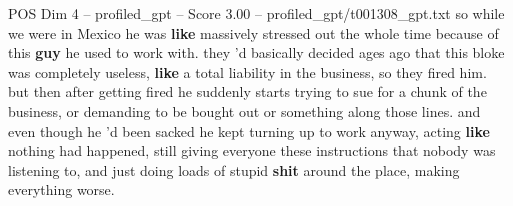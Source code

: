 \begin{textsample}{POS Dim 4 – profiled\_gpt – Score 3.00 – profiled\_gpt/t001308\_gpt.txt}  \label{ex:f4_pos_031}
so while we were in Mexico he was \textbf{like} massively stressed out the whole time because of this \textbf{guy} he used to work with. they ’d basically decided ages ago that this bloke was completely useless, \textbf{like} a total liability in the business, so they fired him. but then after getting fired he suddenly starts trying to sue for a chunk of the business, or demanding to be bought out or something along those lines. and even though he ’d been sacked he kept turning up to work anyway, acting \textbf{like} nothing had happened, still giving everyone these instructions that nobody was listening to, and just doing loads of stupid \textbf{shit} around the place, making everything worse.

\end{textsample}
